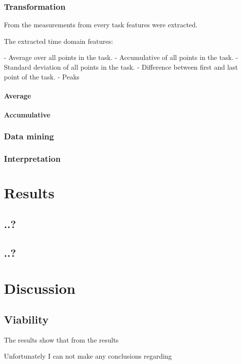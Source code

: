 \documentclass[12pt,fleqn,leqno,letterpaper]{article}
\begin{document}
\subsubsection{Transformation}
From the measurements from every task features were extracted. 

The extracted time domain features:

- Average over all points in the task.
- Accumulative of all points in the task.
- Standard deviation of all points in the task.
- Difference between first and last point of the task.
- Peaks

\paragraph{Average}

\paragraph{Accumulative}




\subsubsection{Data mining}
\subsubsection{Interpretation}

\section{Results}

\subsection{..?}
\subsection{..?}

\section{Discussion}
\subsection{Viability}
The results show that from the results 

Unfortunately I can not make any conclusions regarding 
\end{document}
